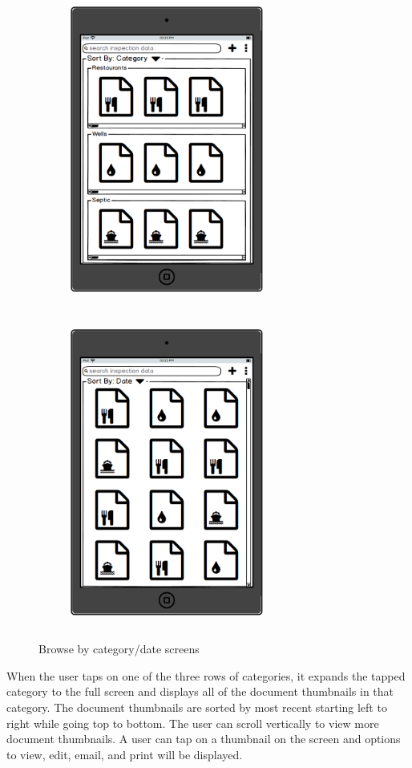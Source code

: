 \documentclass[twoside,letterpaper]{article}
\begin{document}
{\begin{figure}
    \centering
    \begin{subfigure}[h]{0.4\textwidth}
       \includegraphics[width=2.5in,height=4in]{Browse_By_Category.png}
    \end{subfigure}
    \qquad
    \begin{subfigure}[h]{0.4\textwidth}
       \includegraphics[width=2.5in,height=4in]{Browse_By_Date.png}
    \end{subfigure}
     \caption{Browse by category/date screens}
\end{figure}
\newpage
\noindent When the user taps on one of the three rows of categories, it expands the tapped category to the full screen and displays all of the document thumbnails in that category. The document thumbnails are sorted by most recent starting left to right while going top to bottom. The user can scroll vertically to view more document thumbnails. A user can tap on a thumbnail on the screen and options to view, edit, email, and print will be displayed.
\newline

}
\end{document}
